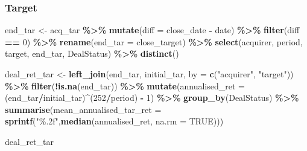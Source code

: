 \documentclass[
]{article}
\newenvironment{Shaded}{\begin{snugshade}}{\end{snugshade}}
\newcommand{\DataTypeTok}[1]{\textcolor[rgb]{0.13,0.29,0.53}{#1}}
\newcommand{\DecValTok}[1]{\textcolor[rgb]{0.00,0.00,0.81}{#1}}
\newcommand{\KeywordTok}[1]{\textcolor[rgb]{0.13,0.29,0.53}{\textbf{#1}}}
\newcommand{\NormalTok}[1]{#1}
\newcommand{\OperatorTok}[1]{\textcolor[rgb]{0.81,0.36,0.00}{\textbf{#1}}}
\newcommand{\OtherTok}[1]{\textcolor[rgb]{0.56,0.35,0.01}{#1}}
\newcommand{\StringTok}[1]{\textcolor[rgb]{0.31,0.60,0.02}{#1}}
\begin{document}
\hypertarget{target-1}{%
\subsubsection{Target}\label{target-1}}

\begin{Shaded}
\begin{Highlighting}[]
\NormalTok{end\_tar \textless{}{-}}\StringTok{ }\NormalTok{acq\_tar }\OperatorTok{\%\textgreater{}\%}
\StringTok{  }\KeywordTok{mutate}\NormalTok{(}\DataTypeTok{diff =}\NormalTok{ close\_date }\OperatorTok{{-}}\StringTok{ }\NormalTok{date) }\OperatorTok{\%\textgreater{}\%}
\StringTok{  }\KeywordTok{filter}\NormalTok{(diff }\OperatorTok{==}\StringTok{ }\DecValTok{0}\NormalTok{) }\OperatorTok{\%\textgreater{}\%}
\StringTok{  }\KeywordTok{rename}\NormalTok{(}\DataTypeTok{end\_tar =}\NormalTok{ close\_target) }\OperatorTok{\%\textgreater{}\%}
\StringTok{  }\KeywordTok{select}\NormalTok{(acquirer, period, target, end\_tar, DealStatus) }\OperatorTok{\%\textgreater{}\%}
\StringTok{  }\KeywordTok{distinct}\NormalTok{()}


\NormalTok{deal\_ret\_tar \textless{}{-}}\StringTok{ }\KeywordTok{left\_join}\NormalTok{(end\_tar, initial\_tar, }\DataTypeTok{by =} \KeywordTok{c}\NormalTok{(}\StringTok{"acquirer"}\NormalTok{, }\StringTok{"target"}\NormalTok{)) }\OperatorTok{\%\textgreater{}\%}
\StringTok{  }\KeywordTok{filter}\NormalTok{(}\OperatorTok{!}\KeywordTok{is.na}\NormalTok{(end\_tar)) }\OperatorTok{\%\textgreater{}\%}
\StringTok{  }\KeywordTok{mutate}\NormalTok{(}\DataTypeTok{annualised\_ret =}\NormalTok{ (end\_tar}\OperatorTok{/}\NormalTok{initial\_tar)}\OperatorTok{\^{}}\NormalTok{(}\DecValTok{252}\OperatorTok{/}\NormalTok{period) }\OperatorTok{{-}}\StringTok{ }\DecValTok{1}\NormalTok{) }\OperatorTok{\%\textgreater{}\%}
\StringTok{  }\KeywordTok{group\_by}\NormalTok{(DealStatus) }\OperatorTok{\%\textgreater{}\%}
\StringTok{  }\KeywordTok{summarise}\NormalTok{(}\DataTypeTok{mean\_annualised\_tar\_ret =} \KeywordTok{sprintf}\NormalTok{(}\StringTok{"\%.2f"}\NormalTok{,}\KeywordTok{median}\NormalTok{(annualised\_ret, }\DataTypeTok{na.rm =} \OtherTok{TRUE}\NormalTok{)))}

\NormalTok{deal\_ret\_tar}
\end{Highlighting}
\end{Shaded}

 
  \providecommand{\huxb}[2]{\arrayrulecolor[RGB]{#1}\global\arrayrulewidth=#2pt}
  \providecommand{\huxvb}[2]{\color[RGB]{#1}\vrule width #2pt}
  \providecommand{\huxtpad}[1]{\rule{0pt}{#1}}
  \providecommand{\huxbpad}[1]{\rule[-#1]{0pt}{#1}}
\end{document}
